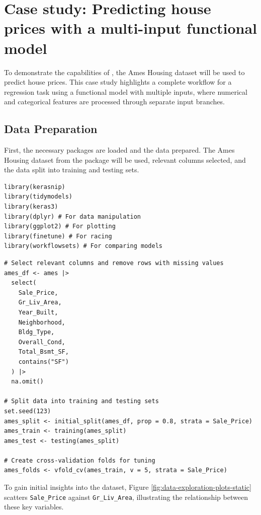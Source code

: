 \section{Case study: Predicting house prices with a multi-input functional model}\label{case-study-predicting-house-prices-with-a-multi-input-functional-model}

To demonstrate the capabilities of , the Ames Housing dataset will be used to predict house prices. This case study highlights a complete  workflow for a regression task using a  functional model with multiple inputs, where numerical and categorical features are processed through separate input branches.

\subsection{Data Preparation}\label{data-preparation}

First, the necessary packages are loaded and the data prepared. The Ames Housing dataset from the  package will be used, relevant columns selected, and the data split into training and testing sets.

\begin{verbatim}
library(kerasnip)
library(tidymodels)
library(keras3)
library(dplyr) # For data manipulation
library(ggplot2) # For plotting
library(finetune) # For racing
library(workflowsets) # For comparing models
\end{verbatim}

\begin{verbatim}
# Select relevant columns and remove rows with missing values
ames_df <- ames |>
  select(
    Sale_Price,
    Gr_Liv_Area,
    Year_Built,
    Neighborhood,
    Bldg_Type,
    Overall_Cond,
    Total_Bsmt_SF,
    contains("SF")
  ) |>
  na.omit()

# Split data into training and testing sets
set.seed(123)
ames_split <- initial_split(ames_df, prop = 0.8, strata = Sale_Price)
ames_train <- training(ames_split)
ames_test <- testing(ames_split)

# Create cross-validation folds for tuning
ames_folds <- vfold_cv(ames_train, v = 5, strata = Sale_Price)
\end{verbatim}

To gain initial insights into the dataset, Figure \ref{fig:data-exploration-plots-static} scatters \texttt{Sale\_Price} against \texttt{Gr\_Liv\_Area}, illustrating the relationship between these key variables.

